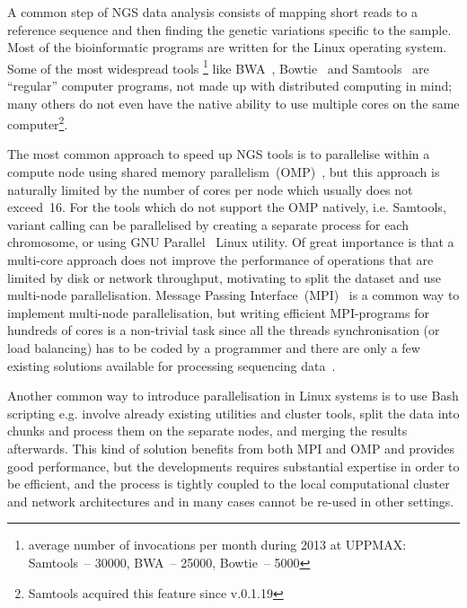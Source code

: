 \documentclass[11pt, oneside]{article}   	%
\begin{document}
A common step of NGS data analysis consists of mapping short reads to a reference sequence and then finding the genetic variations specific to the sample. Most of the bioinformatic programs are written for the Linux operating system. Some of the most widespread tools \footnote{average number of invocations per month during 2013 at UPPMAX: Samtools~-- 30000, BWA~-- 25000, Bowtie~-- 5000} like BWA~\cite{bwa}, Bowtie~\cite{bowtie} and Samtools~\cite{samtools} are ``regular'' computer programs, not made up with distributed computing in mind; many others do not even have the native ability to use multiple cores on the same computer\footnote{Samtools  acquired this feature since v.0.1.19}. 


The most common approach to speed up NGS tools is to parallelise within a compute node using shared memory parallelism~(OMP)~\cite{openmp}, but this approach is naturally limited by the number of cores per node which usually does not exceed~16.  For the tools which do not support the OMP natively, i.e. Samtools, variant calling can be parallelised by creating a separate process  for  each chromosome, or using GNU Parallel~\cite{gnuparallel} Linux utility.
Of great importance is that a multi-core approach does not improve the performance of operations that are limited by disk or network throughput, motivating to split  the dataset and  use multi-node parallelisation. Message Passing Interface~(MPI)~\cite{mpi1} is a common way to implement multi-node parallelisation, but writing efficient MPI-programs for hundreds of cores is a non-trivial task since all the threads synchronisation (or load balancing) has to be coded by a programmer and there are only a few existing solutions available for processing sequencing data~\cite{pmap, erne, gnumap}.

Another common way to introduce parallelisation in Linux systems is to use Bash scripting e.g. involve already existing utilities and cluster tools, split the data into chunks and process them on the separate nodes, and merging the results afterwards. This kind of solution benefits from both MPI and OMP and provides good performance, but the developments requires substantial expertise in order to be efficient, and the process is tightly coupled to the local computational cluster and network architectures and in many cases cannot be re-used in other settings.
\end{document}
